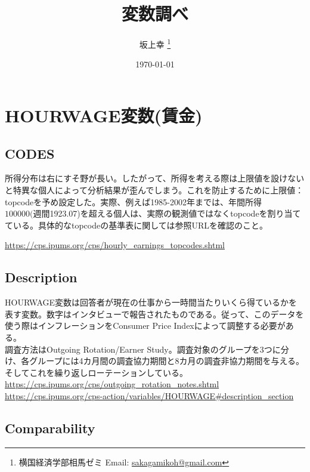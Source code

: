 \documentclass{jsarticle}
\newcommand{\footremember}[2]{%
        \footnote{#2}
        \newcounter{#1}
        \setcounter{#1}{\value{footnote}}%
}
\begin{document}
\title{変数調べ}
\author{坂上幸\footremember{alley}{横国経済学部相馬ゼミ Email:
\protect \url{sakagamikoh@gmail.com}}}
\date{\today}

\maketitle

\section{HOURWAGE変数(賃金)}

\subsection{CODES}

所得分布は右にすそ野が長い。したがって、所得を考える際は上限値を設けないと特異な個人によって分析結果が歪んでしまう。これを防止するために上限値：topcodeを予め設定した。実際、例えば1985-2002年までは、年間所得$100000(週間$1923.07)を超える個人は、実際の観測値ではなくtopcodeを割り当てている。具体的なtopcodeの基準表に関しては参照URLを確認のこと。

\url{https://cps.ipums.org/cps/hourly_earnings_topcodes.shtml}
 
\subsection{Description}

HOURWAGE変数は回答者が現在の仕事から一時間当たりいくら得ているかを表す変数。数字はインタビューで報告されたものである。従って、このデータを使う際はインフレーションをConsumer Price Indexによって調整する必要がある。\\
  
 

調査方法はOutgoing Rotation/Earner Study。調査対象のグループを3つに分け、各グループには4カ月間の調査協力期間と8カ月の調査非協力期間を与える。そしてこれを繰り返しローテーションしている。\\
  
\url{https://cps.ipums.org/cps/outgoing_rotation_notes.shtml}\\
  
\url{https://cps.ipums.org/cps-action/variables/HOURWAGE#description_section}

\subsection{Comparability}
\end{document}
